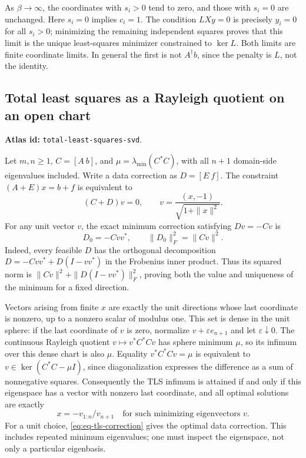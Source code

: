 \documentclass[11pt,a4paper]{article}
\DeclareRobustCommand{\code}[1]{{\footnotesize\urlstyle{tt}\nolinkurl{#1}}}
\begin{document}
As $\beta\to\infty$, the coordinates with $s_i>0$ tend to zero,
and those with $s_i=0$ are unchanged. Here $s_i=0$ implies $c_i=1$.
The condition $LXy=0$ is precisely $y_i=0$ for all $s_i>0$; minimizing
the remaining independent squares proves that this limit is the unique
least-squares minimizer constrained to $\ker L$. Both limits are finite
coordinate limits. In general the first is not $A^\dagger b$, since the
penalty is $L$, not the identity.

\subsection{Total least squares as a Rayleigh quotient on an open chart}
\label{sec:eq-tls}
\textbf{Atlas id:} \code{total-least-squares-svd}.

Let $m,n\ge1$, $C=[A\ b]$, and
$\mu=\lambda_{\min}(C^*C)$, with all $n+1$ domain-side eigenvalues
included. Write a data correction as $D=[E\ f]$. The constraint
$(A+E)x=b+f$ is equivalent to
\[
 (C+D)v=0,\qquad
 v=\frac{(x,-1)}{\sqrt{1+\|x\|^2}}.
\]
For any unit vector $v$, the exact minimum correction satisfying
$Dv=-Cv$ is
\begin{equation}\label{eq:eq-tls-correction}
 D_0=-Cvv^*,\qquad \|D_0\|_F^2=\|Cv\|^2.
\end{equation}
Indeed, every feasible $D$ has the orthogonal decomposition
$D=-Cvv^*+D(I-vv^*)$ in the Frobenius inner product. Thus its squared
norm is $\|Cv\|^2+\|D(I-vv^*)\|_F^2$, proving both the value and
uniqueness of the minimum for a fixed direction.

Vectors arising from finite $x$ are exactly the unit directions whose
last coordinate is nonzero, up to a nonzero scalar of modulus one.
This set is dense in the unit sphere: if the last coordinate of $v$
is zero, normalize $v+\varepsilon e_{n+1}$ and let $\varepsilon\downarrow0$.
The continuous Rayleigh quotient $v\mapsto v^*C^*Cv$ has sphere minimum
$\mu$, so its infimum over this dense chart is also $\mu$.
Equality $v^*C^*Cv=\mu$ is equivalent to
$v\in\ker(C^*C-\mu I)$, since diagonalization expresses the difference
as a sum of nonnegative squares. Consequently the TLS infimum is
attained if and only if this eigenspace has a vector with nonzero last
coordinate, and all optimal solutions are exactly
\[
 x=-v_{1:n}/v_{n+1}
 \quad\text{for such minimizing eigenvectors }v.
\]
For a unit choice, \eqref{eq:eq-tls-correction} gives the optimal data
correction. This includes repeated minimum eigenvalues; one must inspect
the eigenspace, not only a particular eigenbasis.
\end{document}
